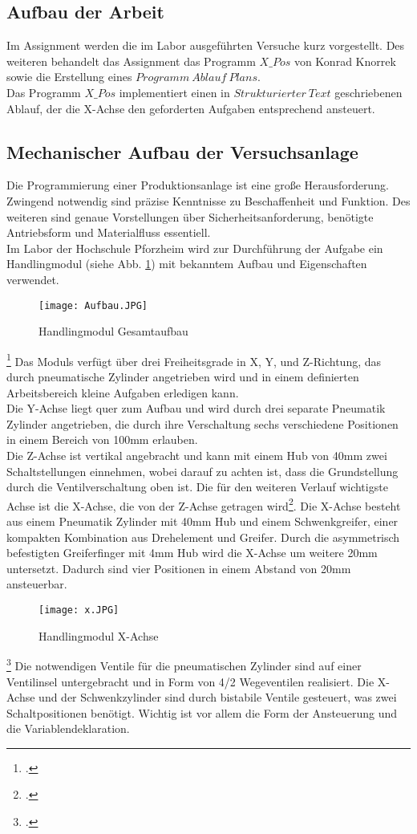 \documentclass[12pt,a4paper]{scrartcl}	%
\begin{document}
\subsection{Aufbau der Arbeit}
Im Assignment werden die im Labor ausgeführten Versuche kurz vorgestellt. Des weiteren behandelt das Assignment das Programm $X\_Pos$ von Konrad Knorrek sowie die Erstellung eines $Programm~Ablauf~Plans$.\\
Das Programm $X\_Pos$ implementiert einen in $Strukturierter~Text$ geschriebenen Ablauf, der die X-Achse den geforderten Aufgaben entsprechend ansteuert.
\subsection{Mechanischer Aufbau der Versuchsanlage}
Die Programmierung einer Produktionsanlage ist eine große Herausforderung. Zwingend notwendig sind präzise Kenntnisse zu Beschaffenheit und Funktion. Des weiteren sind genaue Vorstellungen über Sicherheitsanforderung, benötigte Antriebsform und Materialfluss essentiell.\\
Im Labor der Hochschule Pforzheim wird zur Durchführung der Aufgabe ein Handlingmodul (siehe Abb. \ref{Aufbau}) mit bekanntem Aufbau und Eigenschaften verwendet.\\
\begin{figure}[h] 
	\centering
	\texttt{[image: Aufbau.JPG]}
	\caption[Handlingmodul Gesamtaufbau]{Handlingmodul Gesamtaufbau\footnotemark} 
	\label{Aufbau}
\end{figure}
\footcitetext[vgl.][S 4]{Labor} 
Das Moduls verfügt über drei Freiheitsgrade in X, Y, und Z-Richtung, das durch pneumatische Zylinder angetrieben wird und in einem definierten Arbeitsbereich kleine Aufgaben erledigen kann.\\
Die Y-Achse liegt quer zum Aufbau und wird durch drei separate Pneumatik Zylinder angetrieben, die durch ihre Verschaltung sechs verschiedene Positionen in einem Bereich von 100mm erlauben.\\
Die Z-Achse ist vertikal angebracht und kann mit einem Hub von 40mm zwei Schaltstellungen einnehmen, wobei darauf zu achten ist, dass die Grundstellung durch die Ventilverschaltung oben ist.
Die für den weiteren Verlauf wichtigste Achse ist die X-Achse, die von der Z-Achse getragen wird\footcite[vgl.][S 5\psqq]{Labor}. Die X-Achse besteht aus einem Pneumatik Zylinder mit 40mm Hub und einem Schwenkgreifer, einer kompakten Kombination aus Drehelement und Greifer. Durch die asymmetrisch befestigten Greiferfinger mit 4mm Hub wird die X-Achse um weitere 20mm untersetzt. Dadurch sind vier Positionen in einem Abstand von 20mm ansteuerbar. 
\begin{figure}[h] \label{x}
	\centering
	\texttt{[image: x.JPG]}
	\caption[Handlingmodul X-Achse]{Handlingmodul X-Achse\footnotemark} 
\end{figure}
\footcitetext[vgl.][S 7]{Labor}
Die notwendigen Ventile für die pneumatischen Zylinder sind auf einer Ventilinsel untergebracht und in Form von 4/2 Wegeventilen realisiert. Die X-Achse und der Schwenkzylinder sind durch bistabile Ventile gesteuert, was zwei Schaltpositionen benötigt. Wichtig ist vor allem die Form der Ansteuerung und die Variablendeklaration.
\end{document}
